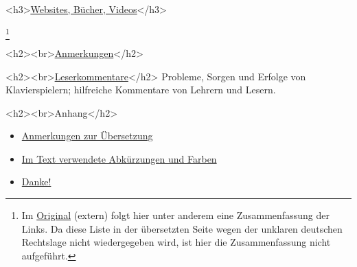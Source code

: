 <h3>\underline{\hyperlink{Websites}{Websites, Bücher, Videos}}</h3>

\footnote{Im \hyperref[http://www.pianopractice.org]{Original} (extern) folgt hier unter anderem eine Zusammenfassung der Links.
Da diese Liste in der übersetzten Seite wegen der unklaren deutschen Rechtslage nicht wiedergegeben wird, ist hier die Zusammenfassung nicht aufgeführt.}


<h2><br>\hyperlink{anmerkungen}{Anmerkungen}</h2>

<h2><br>\hyperlink{testimonials}{Leserkommentare}</h2>
Probleme, Sorgen und Erfolge von Klavierspielern; hilfreiche Kommentare von Lehrern und Lesern.


<h2><br>Anhang</h2>

\begin{itemize} 
 \item \hyperlink{ueberset}{Anmerkungen zur Übersetzung}
 \item \hyperlink{AbkFarben}{Im Text verwendete Abkürzungen und Farben}
 \item \hyperlink{Danke}{Danke!}
 \end{itemize}




